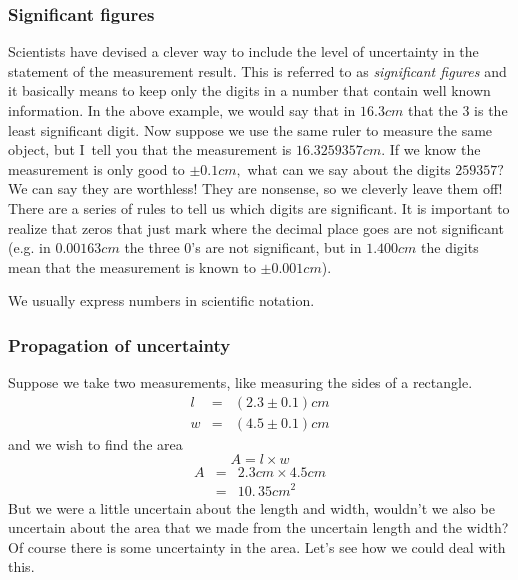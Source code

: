 \documentclass[]{Book}
\begin{document}
\subsubsection{Significant figures}

Scientists have devised a clever way to include the level of uncertainty in
the statement of the measurement result. This is referred to as \emph{%
	significant figures} and it basically means to keep only the digits in a
number that contain well known information. In the above example, we would
say that in $16.3\unit{cm}$ that the $3$ is the least significant digit. Now
suppose we use the same ruler to measure the same object, but I\ tell you
that the measurement is $16.3259357\unit{cm}.$ If we know the measurement is
only good to $\pm 0.1\unit{cm},$ what can we say about the digits $259357?$
We can say they are worthless! They are nonsense, so we cleverly leave them
off! There are a series of rules to tell us which digits are significant. It
is important to realize that zeros that just mark where the decimal place
goes are not significant (e.g. in $0.00163\unit{cm}$ the three $0$'s are not
significant, but in $1.400\unit{cm}$ the digits mean that the measurement is
known to $\pm 0.001\unit{cm}$).

We usually express numbers in scientific notation.

\subsubsection{Propagation of uncertainty}

Suppose we take two measurements, like measuring the sides of a rectangle. 
\begin{eqnarray*}
	l &=&\left( 2.3\pm 0.1\right) \unit{cm} \\
	w &=&\left( 4.5\pm 0.1\right) \unit{cm}
\end{eqnarray*}%
and we wish to find the area%
\begin{equation*}
	A=l\times w
\end{equation*}%
\begin{eqnarray*}
	A &=&2.3\unit{cm}\times 4.5\unit{cm} \\
	&=&\allowbreak 10.\,\allowbreak 35\unit{cm}^{2}
\end{eqnarray*}%
But we were a little uncertain about the length and width, wouldn't we also
be uncertain about the area that we made from the uncertain length and the
width? Of course there is some uncertainty in the area. Let's see how we
could deal with this.
\end{document}
